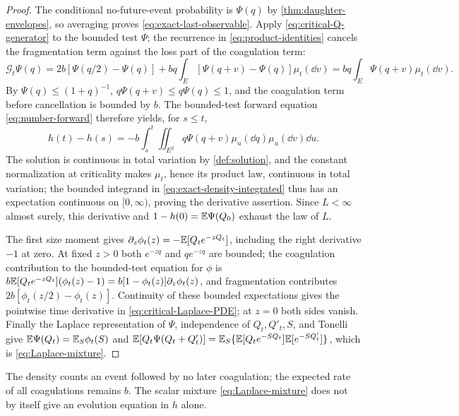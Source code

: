 \begin{proof}
The conditional no-future-event probability is $\Psi(q)$ by
\cref{thm:daughter-envelopes}, so averaging proves
\eqref{eq:exact-last-observable}. Apply \eqref{eq:critical-Q-generator}
to the bounded test $\Psi$; the recurrence in
\eqref{eq:product-identities} cancels the fragmentation term against
the loss part of the coagulation term:
\[
 \mathcal G_t\Psi(q)
 =2b[\Psi(q/2)-\Psi(q)]
       +bq\int_E[\Psi(q+v)-\Psi(q)]\mu_t(\dd v)
 =bq\int_E\Psi(q+v)\mu_t(\dd v).
\]
By $\Psi(q)\leq(1+q)^{-1}$, $q\Psi(q+v)\leq q\Psi(q)\leq1$, and the
coagulation term before cancellation is bounded by $b$. The
bounded-test forward equation \eqref{eq:number-forward} therefore
yields, for $s\leq t$,
\begin{equation}
 h(t)-h(s)=-b\int_s^t\iint_{E^2}q\Psi(q+v)
                         \mu_u(\dd q)\mu_u(\dd v)\dd u.
 \label{eq:exact-density-integrated}
\end{equation}
The solution is continuous in total variation by \cref{def:solution},
and the constant normalization at criticality makes $\mu_t$, hence its
product law, continuous in total variation; the bounded integrand in
\eqref{eq:exact-density-integrated} thus has an expectation continuous
on $[0,\infty)$, proving the derivative assertion. Since $L<\infty$
almost surely, this derivative and $1-h(0)=\mathbb E\Psi(Q_0)$ exhaust the
law of $L$.

The first size moment gives $\partial_z\phi_t(z)=-\mathbb E[Q_te^{-zQ_t}]$,
including the right derivative $-1$ at zero. At fixed $z>0$ both
$e^{-zq}$ and $qe^{-zq}$ are bounded; the coagulation contribution to
the bounded-test equation for $\phi$ is
$b\mathbb E[Q_te^{-zQ_t}](\phi_t(z)-1)=b[1-\phi_t(z)]\partial_z\phi_t(z)$,
and fragmentation contributes $2b[\phi_t(z/2)-\phi_t(z)]$. Continuity
of these bounded expectations gives the pointwise time derivative in
\eqref{eq:critical-Laplace-PDE}; at $z=0$ both sides vanish. Finally
the Laplace representation of $\Psi$, independence of $Q_t,Q'_t,S$,
and Tonelli give $\mathbb E\Psi(Q_t)=\mathbb E_S\phi_t(S)$ and
$\mathbb E[Q_t\Psi(Q_t+Q'_t)]=\mathbb E_S\{\mathbb E[Q_te^{-SQ_t}]\mathbb E[e^{-SQ'_t}]\}$, which
is \eqref{eq:Laplace-mixture}.
\end{proof}

The density counts an event followed by no later coagulation; the
expected rate of all coagulations remains $b$. The scalar mixture
\eqref{eq:Laplace-mixture} does not by itself give an evolution
equation in $h$ alone.

